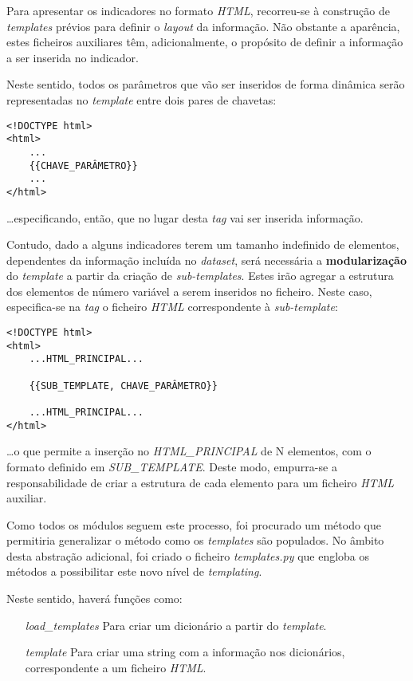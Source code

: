 Para apresentar os indicadores no formato \textit{HTML}, recorreu-se à construção de \textit{templates} prévios
para definir o \textit{layout} da informação.
Não obstante a aparência, estes ficheiros auxiliares têm, adicionalmente, o propósito de definir a 
informação a ser inserida no indicador.

Neste sentido, todos os parâmetros que vão ser inseridos de forma dinâmica serão representadas no \textit{template} entre dois pares de
chavetas: 
\begin{verbatim}
<!DOCTYPE html>
<html>
    ...
    {{CHAVE_PARÂMETRO}}
    ...
</html>
\end{verbatim}

\dots especificando, então, que no lugar desta \textit{tag} vai ser inserida informação.

Contudo, dado a alguns indicadores terem um tamanho indefinido de elementos, dependentes da informação incluída no \textit{dataset}, será necessária a \textbf{modularização} 
do \textit{template} a partir da criação de \textit{sub-templates}.
Estes irão agregar a estrutura dos elementos de número variável a serem inseridos no ficheiro.
Neste caso, especifica-se na \textit{tag} o ficheiro \textit{HTML} correspondente à \textit{sub-template}:
\begin{verbatim}
<!DOCTYPE html>
<html>
    ...HTML_PRINCIPAL...

    {{SUB_TEMPLATE, CHAVE_PARÂMETRO}}

    ...HTML_PRINCIPAL...
</html>
\end{verbatim}

\dots o que permite a inserção no \textit{HTML\_PRINCIPAL} de N elementos, com o formato definido em \textit{SUB\_TEMPLATE}.
Deste modo, empurra-se a responsabilidade de criar a estrutura de cada elemento para um ficheiro \textit{HTML} auxiliar.

Como todos os módulos seguem este processo, foi procurado um método que permitiria generalizar o método como os \textit{templates} são populados.
No âmbito desta abstração adicional, foi criado o ficheiro \textit{templates.py} que engloba os métodos a possibilitar este novo nível de \textit{templating}.

Neste sentido, haverá funções como:
\begin{itemize}
    \item[\textit{load\_templates}]Para criar um dicionário a partir do \textit{template}.
    \item[\textit{template}]Para criar uma string com a informação nos dicionários, correspondente a um ficheiro \textit{HTML}.
\end{itemize}

